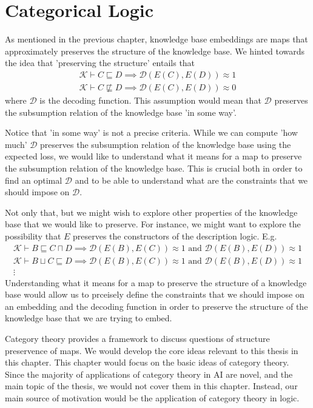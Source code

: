 %
\chapter*{\thechapter \quad Categorical Logic}
As mentioned in the previous chapter,
knowledge base embeddings are maps that approximately preserves the structure of the knowledge base.
We hinted towards the idea that 'preserving the structure' entails
that
\begin{gather*}
    \mathcal{K}\vdash C\sqsubseteq D \implies \mathcal{D}(E(C),E(D))\approx 1\\
    \mathcal{K}\vdash C\not\sqsubseteq D \implies \mathcal{D}(E(C),E(D))\approx 0
\end{gather*}
where $\mathcal{D}$ is the decoding function.
This assumption would mean that $\mathcal{D}$ preserves the subsumption relation of the knowledge base
'in some way'.

Notice that 'in some way' is not a precise criteria. While we can compute 'how much' 
$\mathcal{D}$ preserves the subsumption relation of the knowledge base using the expected loss,
we would like to understand what it means for a map to preserve the subsumption relation of the knowledge base.
This is crucial both in order to find an optimal $\mathcal{D}$
and to be able to understand what are the constraints that we should impose on $\mathcal{D}$.

Not only that, but we might wish to explore other properties of the knowledge base that we would like to preserve.
For instance, we might want to explore the possibility that $E$
preserves the constructors of the description logic. E.g.
\begin{gather*}
    \mathcal{K}\vdash B\sqsubseteq C\sqcap D \implies \mathcal{D}(E(B),E(C))\approx 1\text{ and } \mathcal{D}(E(B),E(D))\approx 1
    \\
    \mathcal{K}\vdash B\sqcup C\sqsubseteq D \implies \mathcal{D}(E(B),E(C))\approx 1\text{ and } \mathcal{D}(E(B),E(D))\approx 1
    \\
    \vdots
\end{gather*}
Understanding what it means for a map to preserve the structure of a knowledge base
would allow us to prceisely define the constraints that we should impose on 
an embedding and the decoding function in order to preserve the structure of the knowledge base
that we are trying to embed.

Category theory provides a framework to discuss questions of structure preservence of maps.
We would develop the core ideas relevant to this thesis in this chapter. This
chapter would focus on the basic ideas of category theory.
Since
the majority of applications of category theory in AI are novel,
and the main topic of the thesis, we would not cover them in this chapter.
Instead, our main source of motivation would be the application of category theory in logic.

